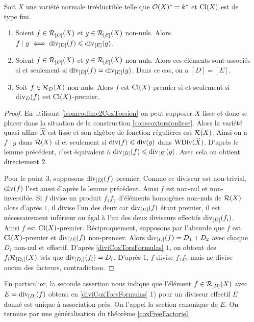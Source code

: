 \begin{prop}
Soit $X$ une variété normale irréductible telle que $\mathcal{O}(X)^*=k^*$ et $\operatorname{Cl}(X)$ est de type fini.
\begin{enumerate}
\item Soient $f\in \mathcal{R}_{[D]}(X)$ et $g\in \mathcal{R}_{[E]}(X)$ non-nuls. Alors $f\mid g\iff \operatorname{div}_{[D]}(f)\leqslant\operatorname{div}_{[E]}(g)$.
\item Soient $f\in \mathcal{R}_{[D]}(X)$ et $g\in \mathcal{R}_{[E]}(X)$ non-nuls. Alors ces éléments sont associés si et seulement si $\operatorname{div}_{[D]}(f)=\operatorname{div}_{[E]}(g)$. Dans ce cas, on a $[D]=[E]$.
\item Soit $f\in \mathcal{R}_D(X)$ non-nuls. Alors $f$ est $\operatorname{Cl}(X)$-premier si et seulement si $\operatorname{div}_D(f)$ est $\operatorname{Cl}(X)$-premier.
\end{enumerate}
\end{prop}
\begin{proof}
En utilisant \ref{isomcodime2CoxTorsion} on peut supposer $X$ lisse et donc se placer dans la situation de la construction \ref{conscoxtorsionlisse}. Alors la variété quasi-affine $\widehat{X}$ est lisse et son algèbre de fonction régulières est $\mathcal{R}(X)$. Ainsi on a $f\mid g$ dans $\mathcal{R}(X)$ si et seulement si $\operatorname{div}(f)\leqslant \operatorname{div}(g)$ dans $\operatorname{WDiv}(\widehat{X})$. D'après le lemme précédent, c'est équivalent à $\operatorname{div}_{[D]}(f)\leqslant\operatorname{div}_{[E]}(g)$. Avec cela on obtient directement $2$.

Pour le point $3$, supposons $\operatorname{div}_{[D]}(f)$ premier. Comme ce diviseur est non-trivial, $\operatorname{div}(f)$ l'est aussi d'après le lemme précédent. Ainsi $f$ est non-nul et non-inversible. Si $f$ divise un produit $f_1f_2$ d'éléments homogènes non-nuls de $\mathcal{R}(X)$ alors d'après $1$, il divise l'un des deux car $\operatorname{div}_{[D]}(f)$ étant premier, il est nécessairement inférieur ou égal à l'un des deux diviseurs effectifs  $\operatorname{div}_{[D]}(f_i)$. Ainsi $f$ est $\operatorname{Cl}(X)$-premier. Réciproquement, supposons par l'absurde que $f$ est $\operatorname{Cl}(X)$-premier et $\operatorname{div}_{[D]}(f)$ non-premier. Alors $\operatorname{div}_{[D]}(f)=D_1+D_2$ avec chaque $D_i$ non-nul et effectif. D'après \ref{diviCoxTorsFormulas} $1$, on obtient des $f_i\mathcal{R}_{[D_i]}(X)$ tels que $\operatorname{div}_{[D_i]}(f_i)=D_i$. D'après $1$, $f$ divise $f_1f_2$ mais ne divise aucun des facteurs, contradiction.
\end{proof}

En particulier, la seconde assertion nous indique que l'élément $f\in \mathcal{R}_{[D]}(X)$ avec $E=\operatorname{div}_{[D]}(f)$ obtenu en \ref{diviCoxTorsFormulas} 1) pour un diviseur effectif $E$ donné est unique à association près. On l'appel la section canonique de $E$. On termine par une généralisation du théorème \ref{coxFreeFactoriel}.

